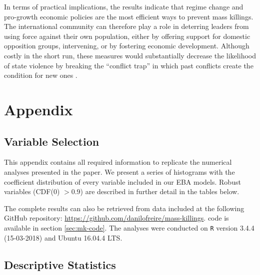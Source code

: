 In terms of practical implications, the results indicate that regime change and pro-growth economic policies are the most efficient ways to prevent mass killings. The international community can therefore play a role in deterring leaders from using force against their own population, either by offering support for domestic opposition groups, intervening, or by fostering economic development. Although costly in the short run, these measures would substantially decrease the likelihood of state violence by breaking the ``conflict trap'' in which past conflicts create the condition for new ones \citep{collier2003breaking}. 

\section{Appendix} 
\label{sec:mk-appendix}

\subsection{Variable Selection}
\label{sec:mk-vs}

This appendix contains all required information to replicate the numerical analyses presented in the paper. We present a series of histograms with the coefficient distribution of every variable included in our EBA models. Robust variables  (CDF(0) $> 0.9$) are described in further detail in the tables below. 

The complete results can also be retrieved from data included at the following GitHub repository: \href{https://github.com/danilofreire/mass-killings}{https://github.com/danilofreire/mass-killings}.  code is available in section \ref{sec:mk-code}. The analyses were conducted on \texttt{R} version 3.4.4 (15-03-2018) and Ubuntu 16.04.4 LTS.

\subsection{Descriptive Statistics}
\label{sec:mk-ds}

